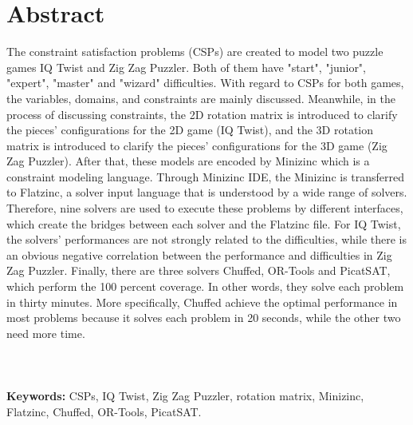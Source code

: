 \chapter*{Abstract}
\vspace{-1em}
The constraint satisfaction problems (CSPs) are created to model two puzzle games IQ Twist and Zig Zag Puzzler. Both of them have "start", "junior", "expert", "master" and "wizard" difficulties. With regard to CSPs for both games, the variables, domains, and constraints are mainly discussed. Meanwhile, in the process of discussing constraints, the 2D rotation matrix is introduced to clarify the pieces' configurations for the 2D game (IQ Twist), and the 3D rotation matrix is introduced to clarify the pieces' configurations for the 3D game (Zig Zag Puzzler). After that, these models are encoded by Minizinc which is a constraint modeling language. Through Minizinc IDE, the Minizinc is transferred to Flatzinc, a solver input language that is understood by a wide range of solvers. Therefore, nine solvers are used to execute these problems by different interfaces, which create the bridges between each solver and the Flatzinc file. For IQ Twist, the solvers' performances are not strongly related to the difficulties, while there is an obvious negative correlation between the performance and difficulties in Zig Zag Puzzler. Finally, there are three solvers Chuffed, OR-Tools and PicatSAT, which perform the 100 percent coverage. In other words,  they solve each problem in thirty minutes. More specifically, Chuffed achieve the optimal performance in most problems because it solves each problem in 20 seconds, while the other two need more time.
\\
\\
\\
\\\textbf{Keywords:} CSPs, IQ Twist, Zig Zag Puzzler, rotation matrix, Minizinc, Flatzinc, Chuffed, OR-Tools, PicatSAT.


